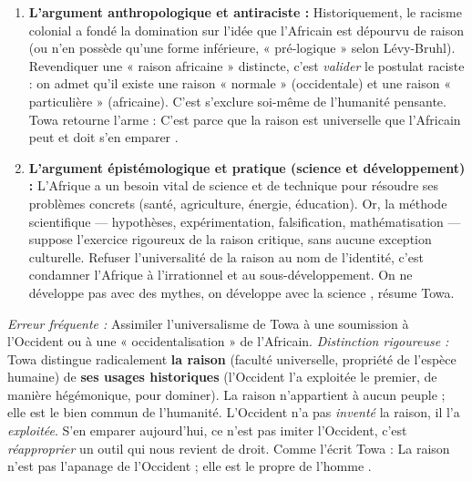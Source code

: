 \documentclass[11pt]{article}
\begin{document}
\begin{aretenir}
\begin{enumerate}
\item \textbf{L'argument anthropologique et antiraciste :} Historiquement, le racisme colonial a fondé la domination sur l'idée que l'Africain est dépourvu de raison (ou n'en possède qu'une forme inférieure, « pré-logique » selon Lévy-Bruhl). Revendiquer une « raison africaine » distincte, c'est \emph{valider} le postulat raciste : on admet qu'il existe une raison « normale » (occidentale) et une raison « particulière » (africaine). C'est s'exclure soi-même de l'humanité pensante. Towa retourne l'arme : \guillemotleft C'est parce que la raison est universelle que l'Africain peut et doit s'en emparer \guillemotright.
\item \textbf{L'argument épistémologique et pratique (science et développement) :} L'Afrique a un besoin vital de science et de technique pour résoudre ses problèmes concrets (santé, agriculture, énergie, éducation). Or, la méthode scientifique — hypothèses, expérimentation, falsification, mathématisation — suppose l'exercice rigoureux de la raison critique, sans aucune exception culturelle. Refuser l'universalité de la raison au nom de l'identité, c'est condamner l'Afrique à l'irrationnel et au sous-développement. \guillemotleft On ne développe pas avec des mythes, on développe avec la science \guillemotright, résume Towa.
\end{enumerate}
\end{aretenir}

\begin{attention}
\emph{Erreur fréquente :} Assimiler l'universalisme de Towa à une soumission à l'Occident ou à une « occidentalisation » de l'Africain.
\emph{Distinction rigoureuse :} Towa distingue radicalement \textbf{la raison} (faculté universelle, propriété de l'espèce humaine) de \textbf{ses usages historiques} (l'Occident l'a exploitée le premier, de manière hégémonique, pour dominer). La raison n'appartient à aucun peuple ; elle est le bien commun de l'humanité. L'Occident n'a pas \emph{inventé} la raison, il l'a \emph{exploitée}. S'en emparer aujourd'hui, ce n'est pas imiter l'Occident, c'est \emph{réapproprier} un outil qui nous revient de droit. Comme l'écrit Towa : \guillemotleft La raison n'est pas l'apanage de l'Occident ; elle est le propre de l'homme \guillemotright.
\end{attention}
\end{document}
